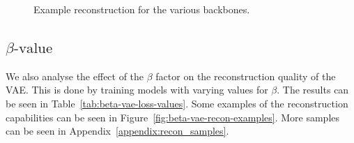 \begin{figure}[!ht]
    \centering
    \caption{Example reconstruction for the various backbones.}
    \label{fig:vae-backbones}
     \quad
\end{figure}




\subsection{$\beta\text{-value}$}
We also analyse the effect of the $\beta$ factor on the reconstruction quality of the VAE. This is done by training models with varying values for $\beta$. The results can be seen in Table~\ref{tab:beta-vae-loss-values}. Some examples of the reconstruction capabilities can be seen in Figure~\ref{fig:beta-vae-recon-examples}. More samples can be seen in Appendix~\ref{appendix:recon_samples}.

